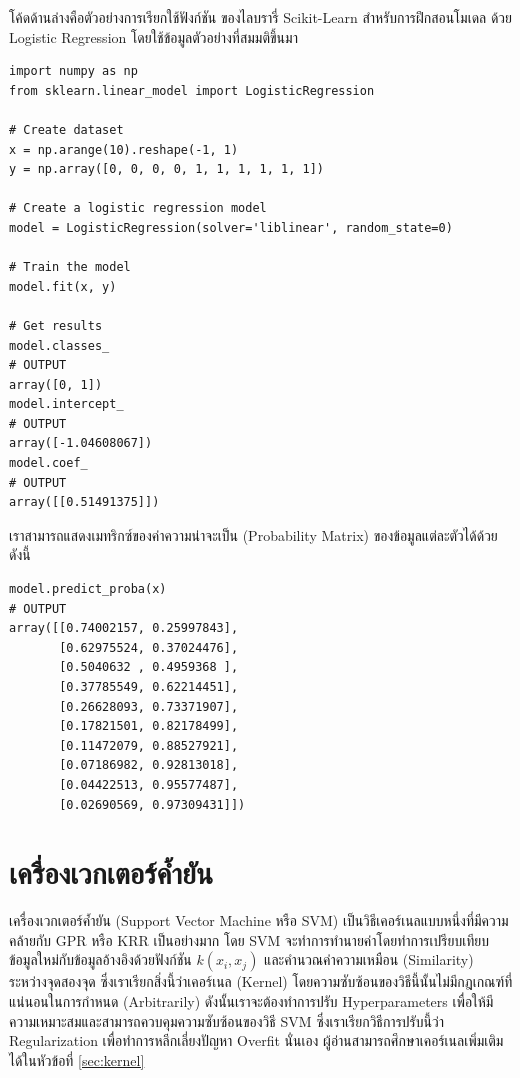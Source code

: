 โค้ดด้านล่างคือตัวอย่างการเรียกใช้ฟังก์ชัน  ของไลบรารี่ Scikit-Learn สำหรับการฝึกสอนโมเดล%
ด้วย Logistic Regression โดยใช้ข้อมูลตัวอย่างที่สมมติขึ้นมา

\begin{lstlisting}[style=MyPython]
import numpy as np
from sklearn.linear_model import LogisticRegression

# Create dataset
x = np.arange(10).reshape(-1, 1)
y = np.array([0, 0, 0, 0, 1, 1, 1, 1, 1, 1])

# Create a logistic regression model
model = LogisticRegression(solver='liblinear', random_state=0)

# Train the model
model.fit(x, y)

# Get results
model.classes_
# OUTPUT
array([0, 1])
model.intercept_
# OUTPUT
array([-1.04608067])
model.coef_
# OUTPUT
array([[0.51491375]])
\end{lstlisting}

\noindent เราสามารถแสดงเมทริกซ์ของค่าความน่าจะเป็น (Probability Matrix) ของข้อมูลแต่ละตัวได้ด้วย ดังนี้

\begin{lstlisting}[style=MyPython]
model.predict_proba(x)
# OUTPUT
array([[0.74002157, 0.25997843],
       [0.62975524, 0.37024476],
       [0.5040632 , 0.4959368 ],
       [0.37785549, 0.62214451],
       [0.26628093, 0.73371907],
       [0.17821501, 0.82178499],
       [0.11472079, 0.88527921],
       [0.07186982, 0.92813018],
       [0.04422513, 0.95577487],
       [0.02690569, 0.97309431]])
\end{lstlisting}

\section{เครื่องเวกเตอร์ค้ำยัน}
\label{sec:svm}

เครื่องเวกเตอร์ค้ำยัน (Support Vector Machine หรือ SVM) เป็นวิธีเคอร์เนลแบบหนึ่งที่มีความคล้ายกับ GPR หรือ KRR เป็นอย่างมาก โดย SVM 
จะทำการทำนายค่าโดยทำการเปรียบเทียบข้อมูลใหม่กับข้อมูลอ้างอิงด้วยฟังก์ชัน $k(x_{i},x_{j})$ และคำนวณค่าความเหมือน (Similarity) 
ระหว่างจุดสองจุด ซึ่งเราเรียกสิ่งนี้ว่าเคอร์เนล (Kernel) โดยความซับซ้อนของวิธีนี้นั้นไม่มีกฎเกณฑ์ที่แน่นอนในการกำหนด (Arbitrarily)
ดังนั้นเราจะต้องทำการปรับ Hyperparameters เพื่อให้มีความเหมาะสมและสามารถควบคุมความซับซ้อนของวิธี SVM ซึ่งเราเรียกวิธีการปรับนี้ว่า 
Regularization เพื่อทำการหลีกเลี่ยงปัญหา Overfit นั่นเอง ผู้อ่านสามารถศึกษาเคอร์เนลเพิ่มเติมได้ในหัวข้อที่ \ref{sec:kernel}

